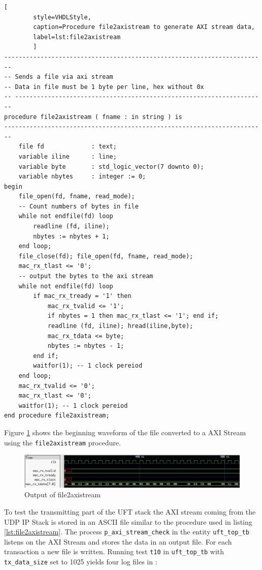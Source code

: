 \clearpage
\begin{minipage}{\linewidth}
    \begin{lstlisting}[
        style=VHDLStyle, 
        caption=Procedure file2axistream to generate AXI stream data, 
        label=lst:file2axistream
        ]
------------------------------------------------------------------------
-- Sends a file via axi stream
-- Data in file must be 1 byte per line, hex without 0x
-- ---------------------------------------------------------------------
procedure file2axistream ( fname : in string ) is
------------------------------------------------------------------------
    file fd             : text;
    variable iline      : line;
    variable byte       : std_logic_vector(7 downto 0);
    variable nbytes     : integer := 0;
begin
    file_open(fd, fname, read_mode);
    -- Count numbers of bytes in file
    while not endfile(fd) loop
        readline (fd, iline);
        nbytes := nbytes + 1;
    end loop;
    file_close(fd); file_open(fd, fname, read_mode);
    mac_rx_tlast <= '0';
    -- output the bytes to the axi stream
    while not endfile(fd) loop
        if mac_rx_tready = '1' then
            mac_rx_tvalid <= '1';
            if nbytes = 1 then mac_rx_tlast <= '1'; end if;
            readline (fd, iline); hread(iline,byte);
            mac_rx_tdata <= byte;
            nbytes := nbytes - 1;
        end if;
        waitfor(1); -- 1 clock pereiod
    end loop;
    mac_rx_tvalid <= '0';
    mac_rx_tlast <= '0';
    waitfor(1); -- 1 clock pereiod
end procedure file2axistream;\end{lstlisting}
\end{minipage}

\clearpage
Figure \ref{fig:file2axistream} shows the beginning waveform of the file 
 converted to a AXI Stream using the 
\texttt{file2axistream} procedure.
\\

\begin{figure}[t!]
    \centering
    \includegraphics[width=\textwidth] {images/validation/file2axistream.png}
    \caption{Output of file2axistream}
    \label{fig:file2axistream}
\end{figure}

To test the transmitting part of the UFT stack the AXI stream coming from the
UDP IP Stack is stored in an ASCII file similar to the procedure used in listing
\ref{lst:file2axistream}. The process \texttt{p\_axi\_stream\_check} in the
entity \texttt{uft\_top\_tb} listens on the AXI Stream and stores the data in an
output file. For each transaction a new file is written. Running test 
\texttt{t10} in \texttt{uft\_top\_tb} with \texttt{tx\_data\_size} set to 1025
yields four log files in :

